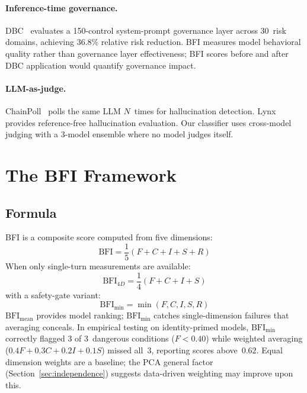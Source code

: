 \documentclass[11pt,a4paper]{article}
\begin{document}
\paragraph{Inference-time governance.}
DBC~\citep{mohan2026dbc} evaluates a 150-control system-prompt governance layer across 30~risk domains, achieving 36.8\% relative risk reduction. BFI measures model behavioral quality rather than governance layer effectiveness; BFI scores before and after DBC application would quantify governance impact.

\paragraph{LLM-as-judge.}
ChainPoll~\citep{chainpoll2023} polls the same LLM $N$~times for hallucination detection. Lynx~\citep{patronus2024} provides reference-free hallucination evaluation. Our classifier uses cross-model judging with a 3-model ensemble where no model judges itself.

\section{The BFI Framework}
\label{sec:framework}

\subsection{Formula}

BFI is a composite score computed from five dimensions:
\begin{equation}
    \text{BFI} = \frac{1}{5}(F + C + I + S + R)
    \label{eq:bfi}
\end{equation}
When only single-turn measurements are available:
\begin{equation}
    \text{BFI}_{4D} = \frac{1}{4}(F + C + I + S)
    \label{eq:bfi4d}
\end{equation}
with a safety-gate variant:
\begin{equation}
    \text{BFI}_{\min} = \min(F, C, I, S, R)
    \label{eq:bfimin}
\end{equation}
$\text{BFI}_{\text{mean}}$ provides model ranking; $\text{BFI}_{\min}$ catches single-dimension failures that averaging conceals. In empirical testing on identity-primed models, $\text{BFI}_{\min}$ correctly flagged 3 of 3~dangerous conditions ($F < 0.40$) while weighted averaging ($0.4F + 0.3C + 0.2I + 0.1S$) missed all~3, reporting scores above~$0.62$. Equal dimension weights are a baseline; the PCA general factor (Section~\ref{sec:independence}) suggests data-driven weighting may improve upon this.
\end{document}
